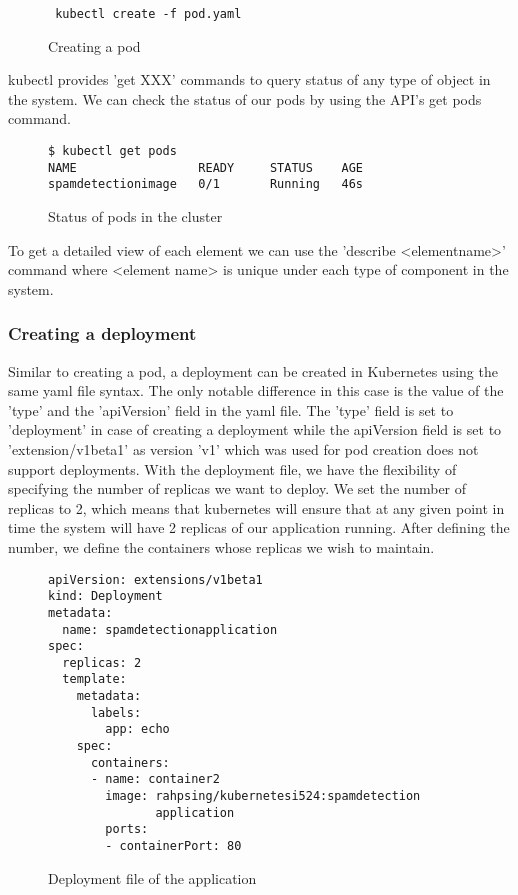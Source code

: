 \documentclass[9pt,twocolumn,twoside]{../../styles/osajnl}
\begin{document}
\begin{figure}[htbp]
\begin{verbatim}
 kubectl create -f pod.yaml
\end{verbatim}
\caption{Creating a pod}
\label{Creating a pod}
\end{figure}

kubectl provides 'get XXX' commands to query status of any type of
object in the system. We can check the status of our pods by using the
API's get pods command.

\begin{figure}[htpb]
\begin{verbatim}
$ kubectl get pods
NAME                 READY     STATUS    AGE
spamdetectionimage   0/1       Running   46s
\end{verbatim}
\caption{Status of pods in the cluster}
\label{Status of pods in the cluster}
\end{figure}
To get a detailed view of each element we can use the 'describe
<element\textunderscore name>' command where <element\textunderscore
name> is unique under each type of component in the system.


\subsubsection{Creating a deployment}
Similar to creating a pod, a deployment can be created in Kubernetes
using the same yaml file syntax. The only notable difference in this
case is the value of the 'type' and the 'apiVersion' field in the yaml
file. The 'type' field is set to 'deployment' in case of creating a
deployment while the apiVersion field is set to 'extension/v1beta1' as
version 'v1' which was used for pod creation does not support
deployments.  With the deployment file, we have the flexibility of
specifying the number of replicas we want to deploy. We set the number
of replicas to 2, which means that kubernetes will ensure that at any
given point in time the system will have 2 replicas of our application
running. After defining the number, we define the containers whose
replicas we wish to maintain.

\begin{figure}[H]
\begin{verbatim}
apiVersion: extensions/v1beta1
kind: Deployment
metadata:
  name: spamdetectionapplication
spec:
  replicas: 2
  template:
    metadata:
      labels:
        app: echo
    spec:
      containers:
      - name: container2
        image: rahpsing/kubernetesi524:spamdetection
               application
        ports:
        - containerPort: 80
\end{verbatim}
\caption{Deployment file of the application}
\vspace{-3mm}
\label{Deployment file of the application}
\end{figure}
\end{document}
